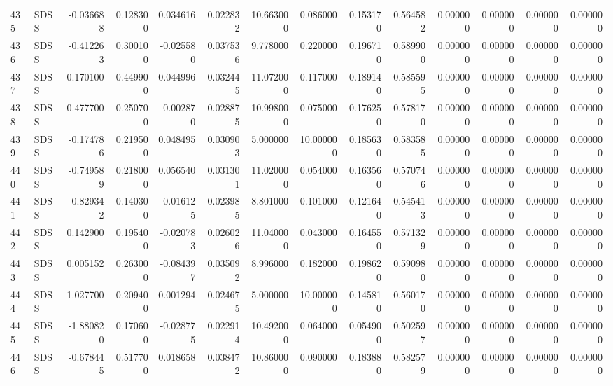 \begin{tabular}{llrrrrrrrrrrrr}
435 &   SDSS & -0.036688 &      0.128300 &  0.034616 &    0.022832 &  10.663000 &      0.086000 &   0.153170 &  0.564582 &  0.000000 &   0.000000 &     0.000000 &     0.000000 \\
436 &   SDSS & -0.412263 &      0.300100 & -0.025580 &    0.037536 &   9.778000 &      0.220000 &   0.196710 &  0.589900 &  0.000000 &   0.000000 &     0.000000 &     0.000000 \\
437 &   SDSS &  0.170100 &      0.449900 &  0.044996 &    0.032445 &  11.072000 &      0.117000 &   0.189140 &  0.585595 &  0.000000 &   0.000000 &     0.000000 &     0.000000 \\
438 &   SDSS &  0.477700 &      0.250700 & -0.002870 &    0.028875 &  10.998000 &      0.075000 &   0.176250 &  0.578170 &  0.000000 &   0.000000 &     0.000000 &     0.000000 \\
439 &   SDSS & -0.174786 &      0.219500 &  0.048495 &    0.030903 &   5.000000 &     10.000000 &   0.185630 &  0.583585 &  0.000000 &   0.000000 &     0.000000 &     0.000000 \\
440 &   SDSS & -0.749589 &      0.218000 &  0.056540 &    0.031301 &  11.020000 &      0.054000 &   0.163560 &  0.570746 &  0.000000 &   0.000000 &     0.000000 &     0.000000 \\
441 &   SDSS & -0.829342 &      0.140300 & -0.016125 &    0.023985 &   8.801000 &      0.101000 &   0.121640 &  0.545413 &  0.000000 &   0.000000 &     0.000000 &     0.000000 \\
442 &   SDSS &  0.142900 &      0.195400 & -0.020783 &    0.026026 &  11.040000 &      0.043000 &   0.164550 &  0.571329 &  0.000000 &   0.000000 &     0.000000 &     0.000000 \\
443 &   SDSS &  0.005152 &      0.263000 & -0.084397 &    0.035092 &   8.996000 &      0.182000 &   0.198620 &  0.590980 &  0.000000 &   0.000000 &     0.000000 &     0.000000 \\
444 &   SDSS &  1.027700 &      0.209400 &  0.001294 &    0.024675 &   5.000000 &     10.000000 &   0.145810 &  0.560170 &  0.000000 &   0.000000 &     0.000000 &     0.000000 \\
445 &   SDSS & -1.880820 &      0.170600 & -0.028775 &    0.022914 &  10.492000 &      0.064000 &   0.054900 &  0.502597 &  0.000000 &   0.000000 &     0.000000 &     0.000000 \\
446 &   SDSS & -0.678445 &      0.517700 &  0.018658 &    0.038472 &  10.860000 &      0.090000 &   0.183880 &  0.582579 &  0.000000 &   0.000000 &     0.000000 &     0.000000 \\

\end{tabular}
